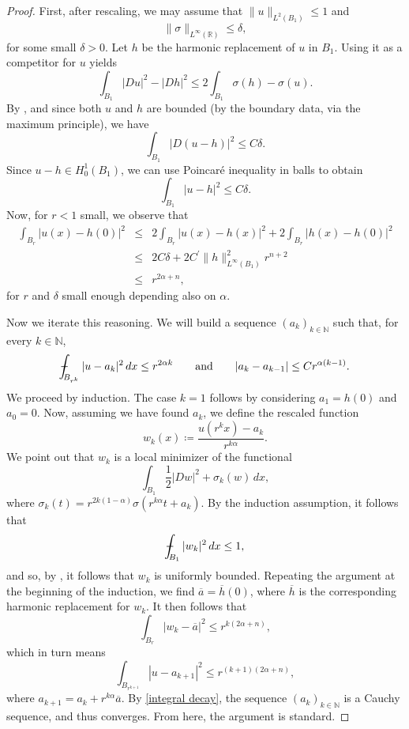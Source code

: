 \documentclass[reqno,11pt]{amsart}
\newcommand{\1}{\mathds{1}}  %
\newcommand{\intav}[1]{\mathchoice 
  {\mathop{\vrule width 6pt height 3 pt depth -2.5pt \kern -8pt \intop}\nolimits_{\kern -6pt#1}} 
  {\mathop{\vrule width 5pt height 3 pt depth -2.6pt \kern -6pt \intop}\nolimits_{#1}}
  {\mathop{\vrule width 5pt height 3 pt depth -2.6pt \kern -6pt \intop}\nolimits_{#1}}
  {\mathop{\vrule width 5pt height 3 pt depth -2.6pt \kern -6pt \intop}\nolimits_{#1}}}
\numberwithin{equation}{section}
\begin{document}
\begin{proof}
First, after rescaling, we may assume that $\|u\|_{L^2(B_1)} \leq 1$ and 
$$\|\sigma\|_{L^\infty(\mathbb{R})} \leq \delta,$$ 
for some small $\delta>0$. Let $h$ be the harmonic replacement of $u$ in $B_1$. Using it as a competitor for $u$ yields
$$
  \int_{B_1}|Du|^2 - |Dh|^2 \leq 2\int_{B_1}\sigma(h) - \sigma(u).  
$$
By , and since both $u$ and $h$ are bounded (by the boundary data, via the maximum principle), we have
$$
    \int_{B_1}|D(u-h)|^2 \leq C\delta.
$$
Since $u-h \in H^1_0(B_1)$, we can use Poincaré inequality in balls to obtain
$$
    \int_{B_1}|u-h|^2 \leq C\delta.
$$
Now, for $r<1$ small, we observe that 
\begin{eqnarray*}
    \int_{B_r}|u(x) - h(0)|^2 & \leq & 2\int_{B_r}|u(x) - h(x)|^2 + 2\int_{B_r}|h(x) - h(0)|^2\\
    & \leq & 2C\delta + 2C^{\prime}\|h\|^2_{L^\infty(B_1)}r^{n+2}\\
    & \leq & r^{2\alpha + n},
\end{eqnarray*}
for $r$ and $\delta$ small enough depending also on $\alpha$.

Now we iterate this reasoning. We will build a sequence $(a_k)_{k \in \mathbb{N}}$ such that, for every $k \in \mathbb{N}$, 
\begin{equation}\label{integral decay}
    \intav{B_{r^k}}|u - a_k|^2\,dx \leq r^{2\alpha k} \qquad \text{and} \qquad |a_{k} - a_{k-1}| \leq Cr^{\alpha (k-1)}.
\end{equation}
We proceed by induction. The case $k=1$ follows by considering $a_1 = h(0)$ and $a_0=0$. Now, assuming we have found $a_k$, we define the rescaled function
$$
    w_k(x) \coloneqq \frac{u(r^k x) - a_k}{r^{k\alpha}}.
$$
We point out that $w_k$ is a local minimizer of the functional
$$
    \int_{B_1}\frac{1}{2}|Dw|^2 + \sigma_k(w)\,dx,
$$
where $\sigma_k(t) = r^{2k(1-\alpha)}\sigma(r^{k\alpha}t + a_k)$. By the induction assumption, it follows that
$$
    \intav{B_1}|w_k|^2\,dx \leq 1,
$$
and so, by , it follows that $w_k$ is uniformly bounded. Repeating the argument at the beginning of the induction, we find $\overline{a} = \overline{h}(0)$, where $\overline{h}$ is the corresponding harmonic replacement for $w_k$. It then follows that
$$
    \int_{B_r}|w_k - \overline{a}|^2 \leq r^{k(2\alpha+n)},
$$
which in turn means
$$
    \int_{B_{r^{k+1}}}|u - a_{k+1}|^2 \leq r^{(k+1)(2\alpha+n)},
$$
where $a_{k+1} = a_k + r^{k\alpha}\overline{a}$. By \eqref{integral decay}, the sequence $(a_k)_{k \in \mathbb{N}}$ is a Cauchy sequence, and thus converges. From here, the argument is standard.
\end{proof}
\end{document}

